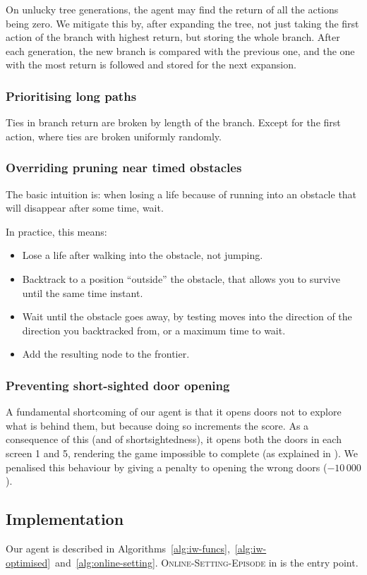On unlucky tree generations, the agent may find the return of all the actions
being zero. We mitigate this by, after expanding the tree, not just taking the
first action of the branch with highest return, but storing the whole branch.
After each generation, the new branch is compared with the previous one, and the
one with the most return is followed and stored for the next expansion.

\subsubsection{Prioritising long paths}
Ties in branch return are broken by length of the branch. Except for the first
action, where ties are broken uniformly randomly.

\subsubsection{Overriding pruning near timed obstacles}
The basic intuition is: when losing a life because of running into an obstacle
that will disappear after some time, wait.

In practice, this means:
\begin{itemize}
  \item Lose a life after walking into the obstacle, not jumping.
  \item Backtrack to a position ``outside'' the obstacle, that allows you to
    survive until the same time instant.
  \item Wait until the obstacle goes away, by testing moves into the direction
    of the direction you backtracked from, or a maximum time to wait.
  \item Add the resulting node to the frontier.
\end{itemize}

\subsubsection{Preventing short-sighted door opening}
A fundamental shortcoming of our agent is that it opens doors not to explore
what is behind them, but because doing so increments the score. As a consequence
of this (and of shortsightedness), it opens both the doors in each screen 1 and
5, rendering the game impossible to complete (as explained in
). We penalised this behaviour by giving a penalty
to opening the wrong doors ($-10\,000$).

\subsection{Implementation\label{subsec:implementation-iw}}
Our agent is described in
Algorithms~\ref{alg:iw-funcs},~\ref{alg:iw-optimised}~and~\ref{alg:online-setting}.
\textsc{Online-Setting-Episode} in  is the entry
point.

